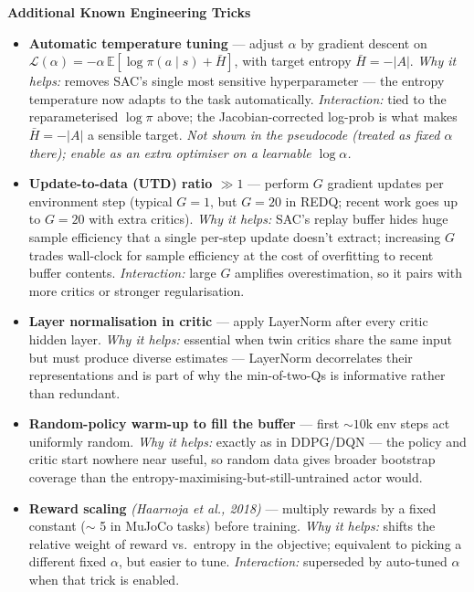 \documentclass[11pt]{article}
\begin{document}
    \label{tricks-4-6}

    \textbf{Additional Known Engineering Tricks}

\begin{itemize}
\item
  \label{trick-4-6-1}\textbf{Automatic temperature
  tuning} --- adjust \(\alpha\) by gradient descent on
  \(\mathcal{L}(\alpha) = -\alpha\,\mathbb{E}[\log\pi(a\mid s) + \bar H]\),
  with target entropy \(\bar H = -|A|\). \emph{Why it helps:} removes
  SAC's single most sensitive hyperparameter --- the entropy temperature
  now adapts to the task automatically. \emph{Interaction:} tied to the
  reparameterised \(\log\pi\) above; the Jacobian-corrected log-prob is
  what makes \(\bar H = -|A|\) a sensible target. \emph{Not shown in the
  pseudocode (treated as fixed \(\alpha\) there); enable as an extra
  optimiser on a learnable \(\log\alpha\).}
\item
  \label{trick-4-6-2}\textbf{Update-to-data (UTD) ratio
  \(\gg 1\)} --- perform \(G\) gradient updates per environment step
  (typical \(G=1\), but \(G=20\) in REDQ; recent work goes up to
  \(G=20\) with extra critics). \emph{Why it helps:} SAC's replay buffer
  hides huge sample efficiency that a single per-step update doesn't
  extract; increasing \(G\) trades wall-clock for sample efficiency at
  the cost of overfitting to recent buffer contents. \emph{Interaction:}
  large \(G\) amplifies overestimation, so it pairs with more critics or
  stronger regularisation.
\item
  \label{trick-4-6-3}\textbf{Layer normalisation in
  critic} --- apply LayerNorm after every critic hidden layer. \emph{Why
  it helps:} essential when twin critics share the same input but must
  produce diverse estimates --- LayerNorm decorrelates their
  representations and is part of why the min-of-two-Qs is informative
  rather than redundant.
\item
  \label{trick-4-6-4}\textbf{Random-policy warm-up to
  fill the buffer} --- first \(\sim\!10\text{k}\) env steps act
  uniformly random. \emph{Why it helps:} exactly as in DDPG/DQN --- the
  policy and critic start nowhere near useful, so random data gives
  broader bootstrap coverage than the
  entropy-maximising-but-still-untrained actor would.
\item
  \label{trick-4-6-5}\textbf{Reward scaling}
  \emph{(Haarnoja et al., 2018)} --- multiply rewards by a fixed
  constant (\(\sim\) 5 in MuJoCo tasks) before training. \emph{Why it
  helps:} shifts the relative weight of reward vs.~entropy in the
  objective; equivalent to picking a different fixed \(\alpha\), but
  easier to tune. \emph{Interaction:} superseded by auto-tuned
  \(\alpha\) when that trick is enabled.
\end{itemize}
\end{document}
